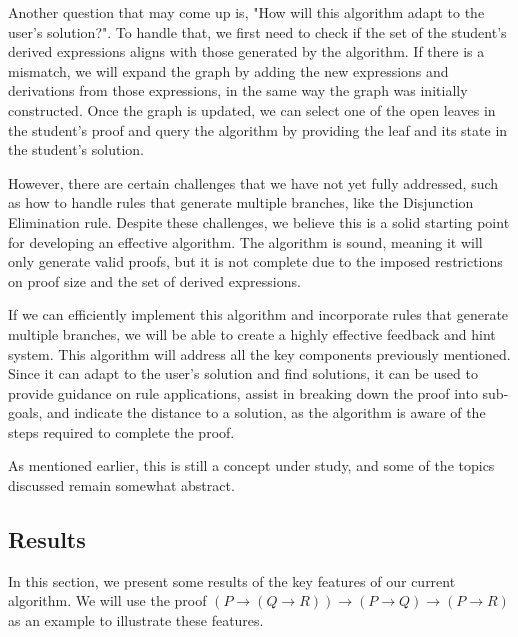 Another question that may come up is, "How will this algorithm adapt to the user's solution?". To handle that, we first need to check if the set of the student's derived expressions aligns with those generated by the algorithm. If there is a mismatch, we will expand the graph by adding the new expressions and derivations from those expressions, in the same way the graph was initially constructed. Once the graph is updated, we can select one of the open leaves in the student's proof and query the algorithm by providing the leaf and its state in the student's solution.

However, there are certain challenges that we have not yet fully addressed, such as how to handle rules that generate multiple branches, like the Disjunction Elimination rule. Despite these challenges, we believe this is a solid starting point for developing an effective algorithm. The algorithm is sound, meaning it will only generate valid proofs, but it is not complete due to the imposed restrictions on proof size and the set of derived expressions.

If we can efficiently implement this algorithm and incorporate rules that generate multiple branches, we will be able to create a highly effective feedback and hint system. This algorithm will address all the key components previously mentioned. Since it can adapt to the user's solution and find solutions, it can be used to provide guidance on rule applications, assist in breaking down the proof into sub-goals, and indicate the distance to a solution, as the algorithm is aware of the steps required to complete the proof.

As mentioned earlier, this is still a concept under study, and some of the topics discussed remain somewhat abstract.

\subsection{Results}
In this section, we present some results of the key features of our current algorithm. We will use the proof \((P \to (Q \to R)) \to (P \to Q) \to (P \to R)\) as an example to illustrate these features.

